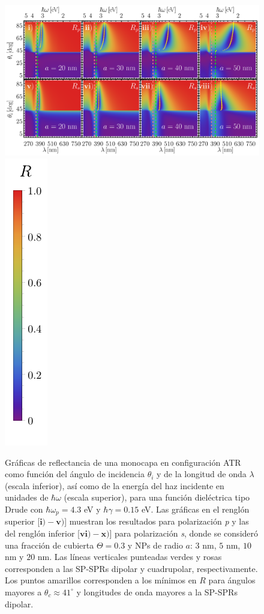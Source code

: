 \begin{figure}[b!]\centering
\includegraphics[width = .76\linewidth]{2-Resultados/figs/9-AgrVar/0-2D_Grid}%
\includegraphics[scale=.89, trim={00 -5 00 00}, clip]{2-Resultados/figs/0-RBar_v}\vspace*{-.5em}
	\caption{Gráficas de reflectancia de una monocapa en configuración ATR como función del ángulo de incidencia $\theta_i$ y de la longitud de onda $\lambda$ (escala inferior), así como de la energía del haz incidente en unidades de $\hbar\omega$ (escala superior), para una función dieléctrica tipo Drude con $\hbar\omega_p=4.3$ eV  y  $\hbar\gamma=0. 15$ eV.  Las gráficas   en el renglón superior [$\mathbf{i)-v)}$] muestran los resultados para  polarización \emph{p} y las del renglón inferior  [$\mathbf{vi)-x)}$]  para polarización  \emph{s}, donde se consideró una fracción de cubierta $\Theta = 0.3$ y  NPs de radio  $a$: $3$ nm, $5$ nm, $10$ nm y $20$ nm.  Las líneas verticales punteadas verdes y rosas corresponden a las SP-SPRs dipolar y  cuadrupolar, respectivamente.  Los puntos amarillos corresponden a los mínimos en $R$ para ángulos mayores a $\theta_c\approx 41^\circ$ y longitudes de onda mayores a la SP-SPRs dipolar.
}	\label{fig:Ag-R-Rad}	
	\end{figure}	

